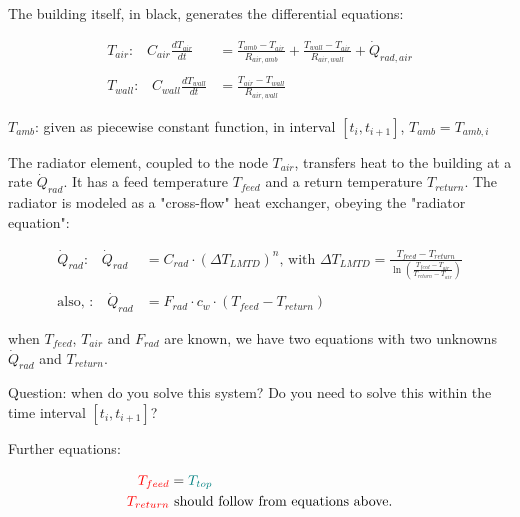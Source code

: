 The building itself, in black, generates the differential equations:

\begin{equation}
	\begin{aligned}
		T_{air} \text{:} \quad C_{air}\frac{dT_{air}}{dt} &=\frac{T_{amb}-T_{air}}{R_{air, amb}} + \frac{T_{wall}-T_{air}}{R_{air, wall}} + \dot{Q}_{rad, air} 
		\\ \\
		T_{wall} \text{:} \quad C_{wall}\frac{dT_{wall}}{dt} &=\frac{T_{air}-T_{wall}}{R_{air, wall}}
	\end{aligned}
\end{equation}

$T_{amb}$: given as piecewise constant function, in interval $[t_i, t_{i+1}]$, $T_{amb} = T_{amb, i}$

The radiator element, coupled to the node $T_{air}$, transfers heat to the building at a rate $\dot{Q}_{rad}$. It has a feed temperature $T_{feed}$ and a return temperature $T_{return}$. The radiator is modeled as a "cross-flow" heat exchanger, obeying the "radiator equation":

{\color{blue}
\begin{equation}
	\begin{aligned}
		\dot{Q}_{rad} \text{:} \quad \dot{Q}_{rad} &= C_{rad} \cdot (\Delta T_{LMTD})^n \text{, with } \Delta T_{LMTD} = \frac{T_{feed} - T_{return}}{\ln\left(\frac{T_{feed} -T_{air}}{T_{return} - T_{air}}\right)}
		\\ \\
	    \text{also, :} \quad \dot{Q}_{rad} &= F_{rad} \cdot c_w \cdot (T_{feed} - T_{return})
	\end{aligned}
\end{equation}
}

when $T_{feed}$, $T_{air}$ and $F_{rad}$ are known, we have two equations with two unknowns $\dot{Q}_{rad}$ and $T_{return}$.

{\color{red}Question: when do you solve this system? Do you need to solve this within the time interval $[t_i, t_{i+1}]$?}

Further equations:

\begin{equation}
	\begin{aligned}
        {\color{red}T_{feed}} &= {\color{teal}T_{top}} \\
        {\color{red}T_{return}} & \text{ should follow from equations above.}
    \end{aligned}
\end{equation}


